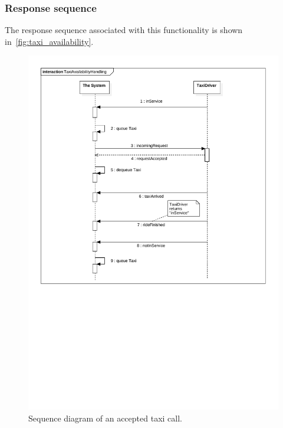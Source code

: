 \subsubsection{Response sequence}
The response sequence associated with this functionality is shown in~\autoref{fig:taxi_availability}.
\begin{figure}
\includegraphics[width=\textwidth]{diagrams/taxi_availability_handling.pdf}
\caption{Sequence diagram of an accepted taxi call.}
\label{fig:taxi_availability}
\end{figure}

